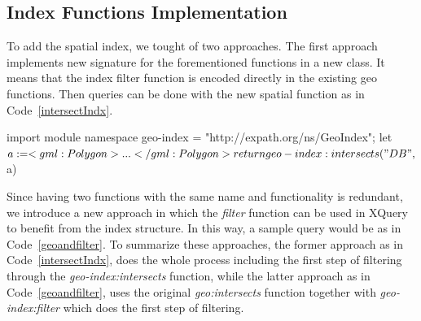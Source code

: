 \documentclass[a4paper,12pt]{article}
\begin{document}
\subsection{Index Functions Implementation}
\label{indexFunc}
To add the spatial index, we tought of two approaches. The first approach implements new signature for the forementioned functions in a new class. It means that the index filter function is encoded directly in the existing geo functions. Then queries can be done with the new spatial function as in Code~\ref{intersectIndx}.
\vspace{10px}
\begin{fakeXML}[label=intersectIndx,caption=The geo function containing the index functions]
import module namespace geo-index = "http://expath.org/ns/GeoIndex";
let $a:= <gml:Polygon> ... </gml:Polygon>
return geo-index:intersects("DB", $a) 
\end{fakeXML}

\vspace{10px}
\vspace{10px}

Since having two functions with the same name and functionality is redundant, we introduce a new approach in which the \textit{filter} function can be used in XQuery to benefit from the index structure. In this way, a sample query would be as in Code~\ref{geoandfilter}. To summarize these approaches, the former approach as in Code~\ref{intersectIndx}, does the whole process including the first step of filtering through the \textit{geo-index:intersects} function, while the latter approach as in Code~\ref{geoandfilter}, uses the original \textit{geo:intersects} function together with \textit{geo-index:filter} which does the first step of filtering. 
\end{document}
